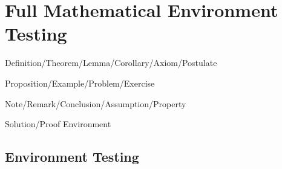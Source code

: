 \chapter{Full Mathematical Environment Testing}
\begin{introduction}
\item Definition/Theorem/Lemma/Corollary/Axiom/Postulate
\item Proposition/Example/Problem/Exercise
\item Note/Remark/Conclusion/Assumption/Property
\item Solution/Proof Environment
\end{introduction}

\section{Environment Testing}

